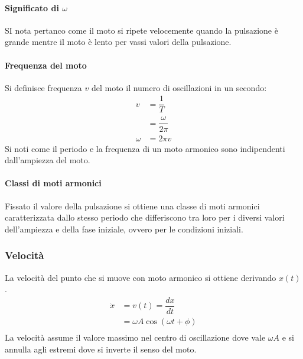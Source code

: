 			\paragraph{Significato di $\omega$}
			SI nota pertanco come il moto si ripete velocemente quando la pulsazione \`e grande mentre il moto \`e lento per vassi valori della pulsazione.

			\paragraph{Frequenza del moto}
			Si definisce frequenza $v$ del moto il numero di oscillazioni in un secondo:
			\begin{align*}
				v &= \dfrac{1}{T}\\
				  &= \dfrac{\omega}{2\pi}\\
				\omega &= 2\pi v
			\end{align*}
			Si noti come il periodo e la frequenza di un moto armonico sono indipendenti dall'ampiezza del moto.

			\paragraph{Classi di moti armonici}
			Fissato il valore della pulsazione si ottiene una classe di moti armonici caratterizzata dallo stesso periodo che differiscono tra loro per i diversi valori dell'ampiezza e della fase iniziale, ovvero per le condizioni iniziali.

		\subsubsection{Velocit\`a}
		La velocit\`a del punto che si muove con moto armonico si ottiene derivando $x(t)$.
		\begin{align*}
			\dot{x} &= v(t) = \dfrac{dx}{dt}\\
			  &=\omega A \cos(\omega t+\phi)\\
		\end{align*}
		La velocit\`a assume il valore massimo nel centro di oscillazione dove vale $\omega A$ e si annulla agli estremi dove si inverte il senso del moto.

